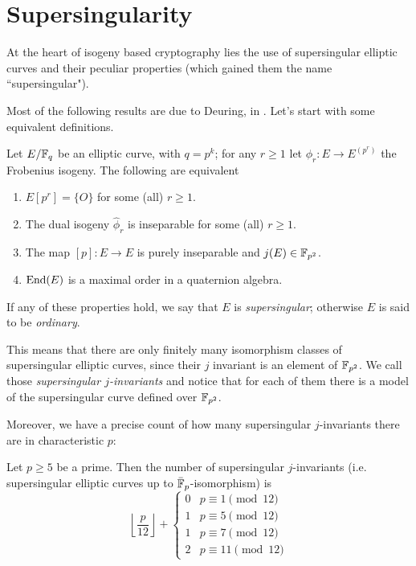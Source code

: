 \section{Supersingularity}

At the heart of isogeny based cryptography lies the use of supersingular elliptic curves and their peculiar properties (which gained them the name ``supersingular").

Most of the following results are due to Deuring, in \cite{Deuring1941}. Let's start with some equivalent definitions.
\begin{theorem}
    Let $E/\mathbb{F}_q$ be an elliptic curve, with $q=p^k$; for any $r\ge1$ let $\phi_r:E\to E^{(p^r)}$ the Frobenius isogeny. The following are equivalent
    \begin{enumerate}
        \item $E[p^r]=\{O\}$ for some (all) $r\ge1$.
        \item The dual isogeny $\hat\phi_r$ is inseparable for some (all) $r\ge1$.
        \item The map $[p]:E\to E$ is purely inseparable and $j(E)\in\mathbb{F}_{p^2}$.
        \item $\operatorname{End}(E)$ is a maximal order in a quaternion algebra.
    \end{enumerate}
    If any of these properties hold, we say that $E$ is \emph{supersingular}; otherwise $E$ is said to be \emph{ordinary}.
\end{theorem}

This means that there are only finitely many isomorphism classes of supersingular elliptic curves, since their $j$ invariant is an element of $\mathbb{F}_{p^2}$. We call those \emph{supersingular $j$-invariants} and notice that for each of them there is a model of the supersingular curve defined over $\mathbb{F}_{p^2}$.

Moreover, we have a precise count of how many supersingular $j$-invariants there are in characteristic $p$:
\begin{theorem}
    Let $p\ge5$ be a prime. Then the number of supersingular $j$-invariants (i.e. supersingular elliptic curves up to $\bar{\mathbb{F}}_p$-isomorphism) is
    $$\left\lfloor \frac{p}{12} \right\rfloor + \begin{cases}
    0 & p\equiv1\pmod{12}\\
    1 & p\equiv5\pmod{12}\\
    1 & p\equiv7\pmod{12}\\
    2 & p\equiv11\pmod{12}
    \end{cases}$$
\end{theorem}

